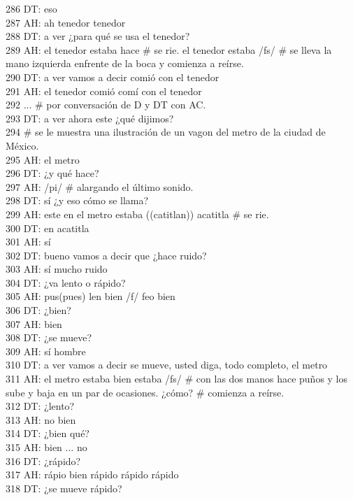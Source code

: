 286 DT: eso\\
287 AH: ah tenedor tenedor \\
288 DT: a ver ¿para qué se usa el tenedor?\\
289 AH: el tenedor estaba hace \# se rie. el tenedor estaba /fs/ # se lleva la mano izquierda enfrente de la boca y comienza a reírse.\\
290 DT: a ver vamos a decir comió con el tenedor\\
291 AH: el tenedor comió comí con el tenedor\\
292 ... \# por conversación de D y DT con AC.\\
293 DT: a ver ahora este ¿qué dijimos?\\
294 \# se le muestra una ilustración de un vagon del metro de la ciudad de México.\\
295 AH: el metro\\
296 DT: ¿y qué hace?\\
297 AH: /pi/ \# alargando el último sonido.\\
298 DT: sí ¿y eso cómo se llama?\\
299 AH: este en el metro estaba ((catitlan)) acatitla \# se rie.\\
300 DT: en acatitla\\
301 AH: sí\\
302 DT: bueno vamos a decir que ¿hace ruido?\\
303 AH: sí mucho ruido\\
304 DT: ¿va lento o rápido?\\
305 AH: pus(pues) len bien /f/ feo bien \\
306 DT: ¿bien?\\
307 AH: bien\\
308 DT: ¿se mueve?\\
309 AH: sí hombre\\
310 DT: a ver vamos a decir se mueve, usted diga, todo completo, el metro\\
311 AH: el metro estaba bien estaba /fs/ \# con las dos manos hace puños y los sube y baja en un par de ocasiones. ¿cómo? # comienza a reírse.\\
312 DT: ¿lento?\\
313 AH: no bien\\
314 DT: ¿bien qué?\\
315 AH: bien ... no\\
316 DT: ¿rápido?\\
317 AH: rápio bien rápido rápido rápido\\
318 DT: ¿se mueve rápido?\\
